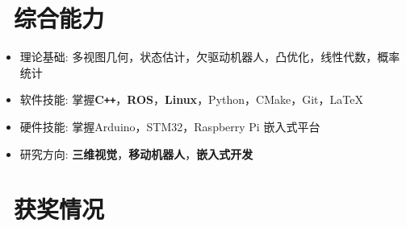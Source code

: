 \documentclass{resume}
\begin{document}
\section{\faCogs\ 综合能力}
\begin{itemize}[parsep=0.5ex]
  \item 理论基础: 多视图几何，状态估计，欠驱动机器人，凸优化，线性代数，概率统计
  \item 软件技能: 掌握\textbf{C\texttt{++}}，\textbf{ROS}，\textbf{Linux}，Python，CMake，Git，\LaTeX
  \item 硬件技能: 掌握Arduino，STM32，Raspberry Pi 嵌入式平台
  \item 研究方向: \textbf{三维视觉}，\textbf{移动机器人}，\textbf{嵌入式开发}
\end{itemize}

\section{\faHeartO\ 获奖情况}
\end{document}
